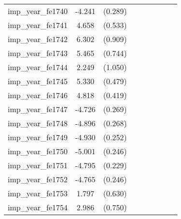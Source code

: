 {\begin{tabular}{l*{4}{cc}}
imp\_year\_fe1740&   -4.241\sym{***}&  (0.289)&                  &         &                  &         &                  &         \\
imp\_year\_fe1741&    4.658\sym{***}&  (0.533)&                  &         &                  &         &                  &         \\
imp\_year\_fe1742&    6.302\sym{***}&  (0.909)&                  &         &                  &         &                  &         \\
imp\_year\_fe1743&    5.465\sym{***}&  (0.744)&                  &         &                  &         &                  &         \\
imp\_year\_fe1744&    2.249\sym{*}  &  (1.050)&                  &         &                  &         &                  &         \\
imp\_year\_fe1745&    5.330\sym{***}&  (0.479)&                  &         &                  &         &                  &         \\
imp\_year\_fe1746&    4.818\sym{***}&  (0.419)&                  &         &                  &         &                  &         \\
imp\_year\_fe1747&   -4.726\sym{***}&  (0.269)&                  &         &                  &         &                  &         \\
imp\_year\_fe1748&   -4.896\sym{***}&  (0.268)&                  &         &                  &         &                  &         \\
imp\_year\_fe1749&   -4.930\sym{***}&  (0.252)&                  &         &                  &         &                  &         \\
imp\_year\_fe1750&   -5.001\sym{***}&  (0.246)&                  &         &                  &         &                  &         \\
imp\_year\_fe1751&   -4.795\sym{***}&  (0.229)&                  &         &                  &         &                  &         \\
imp\_year\_fe1752&   -4.765\sym{***}&  (0.246)&                  &         &                  &         &                  &         \\
imp\_year\_fe1753&    1.797\sym{**} &  (0.630)&                  &         &                  &         &                  &         \\
imp\_year\_fe1754&    2.986\sym{***}&  (0.750)&                  &         &                  &         &                  &         \\

\end{tabular}}
